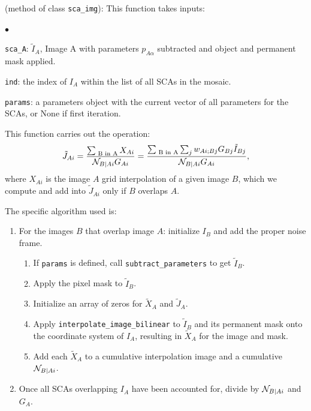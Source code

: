 \documentclass[]{pasj01}
\begin{document}
\vskip 0.1in

 (method of class {\tt sca\_img}): This function takes inputs: 
\begin{list}{$\bullet$}{}
\item{\tt sca\_A}: $\tilde{I}_A$, Image A with parameters $p_{A\alpha}$ subtracted and object and permanent mask applied.
\item{\tt ind}: the index of $I_A$ within the list of all SCAs in the mosaic.
\item{\tt params}: a parameters object with the current vector of all parameters for the SCAs, or None if first iteration.
\end{list}
This function carries out the operation: 
\begin{equation}
  \tilde J_{Ai}=\frac{\sum_{\text{ B in A}} X_{Ai}}{{\cal N}_{B|Ai} G_{Ai}}  
=\frac{\sum_{\text{ B in A}} \sum_j w_{Ai;Bj} G_{Bj} \tilde I_{Bj}}{{\cal N}_{B|Ai} G_{Ai}}  ,
\end{equation}
where $X_{Ai}$ is the image $A$ grid interpolation of a given image $B$, which we compute and add into $\tilde J_{Ai}$ only if $B$ overlaps $A$.

\vskip0.05in

\noindent{}The specific algorithm used is:
\begin{enumerate}
\item For the images $B$ that overlap image $A$: initialize $I_B$ and add the proper noise frame.
\begin{enumerate}
\item If {\tt params} is defined, call {\tt subtract\_parameters} to get $\tilde{I}_B$.
\item Apply the pixel mask to $\tilde{I}_B$.
\item Initialize an array of zeros for $\tilde{X}_A$ and $\tilde{J}_A$.
\item Apply {\tt interpolate\_image\_bilinear} to $\tilde{I}_B$ and its permanent mask onto the coordinate system of $I_A$, resulting in $\tilde{X}_A$ for the image and mask.
\item Add each $\tilde{X}_A$ to a cumulative interpolation image and a cumulative ${\cal N}_{B|Ai}$. 
\end{enumerate}
\item Once all SCAs overlapping $I_A$ have been accounted for, divide by ${\cal N}_{B|Ai}$ and $G_A$.
\end{enumerate}

\vskip 0.1in
\end{document}
